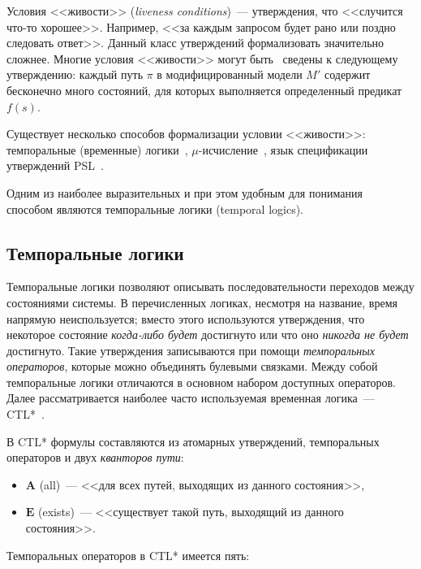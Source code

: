 \documentclass[a4paper,notitlepage,14pt]{article}
\begin{document}
Условия <<живости>> (\emph{liveness conditions})~--- утверждения, что <<случится что-то
хорошее>>. Например, <<за каждым запросом будет рано или поздно следовать ответ>>. Данный
класс утверждений формализовать значительно сложнее. Многие условия <<живости>> могут
быть~\cite{Clarke97anotherlook} сведены к следующему утверждению: каждый путь $\pi$ в
модифицированный модели $M'$ содержит бесконечно много состояний, для которых выполняется
определенный предикат $f(s)$.

Существует несколько способов формализации условии <<живости>>: темпоральные (временные)
логики~\cite{Clarke,Pandya01modelchecking},
$\mu$-исчисление~\cite{Leucker_parallelmodel,Emerson97modelchecking}, язык спецификации
утверждений PSL~\cite{Glazberg_psl:beyond}.

Одним из наиболее выразительных и при этом удобным для понимания~\cite{Stirling96modaland}
способом являются темпоральные логики (temporal logics).

\subsection{Темпоральные логики}
\label{sec:temporal-logics}

Темпоральные логики позволяют описывать последовательности переходов между состояниями
системы. В перечисленных логиках, несмотря на название, время напрямую неиспользуется;
вместо этого используются утверждения, что некоторое состояние \emph{когда-либо будет}
достигнуто или что оно \emph{никогда не будет} достигнуто. Такие утверждения записываются
при помощи \emph{темпоральных операторов}, которые можно объединять булевыми
связками. Между собой темпоральные логики отличаются в основном набором доступных
операторов. Далее рассматривается наиболее часто используемая временная логика~---
CTL*~\cite{Stirling96modaland}.

В CTL* формулы составляются из атомарных утверждений, темпоральных операторов и
двух \emph{кванторов пути}:

\begin{itemize}
\item $\mathbf{A}$ (all)~--- <<для всех путей, выходящих из данного состояния>>,
\item $\mathbf{E}$ (exists)~--- <<существует такой путь, выходящий из данного состояния>>.
\end{itemize}

Темпоральных операторов в CTL* имеется пять:
\end{document}
